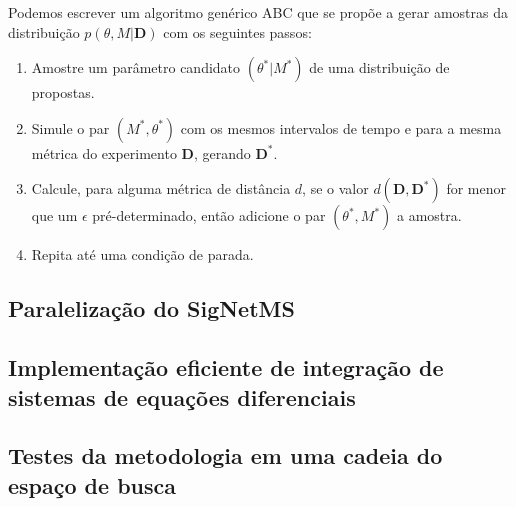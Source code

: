 \documentclass[12pt]{article}
\begin{document}
Podemos escrever um algoritmo genérico ABC que se propõe a gerar 
amostras da distribuição $p(\theta, M | \mathbf{D})$ com os seguintes 
passos:
\begin{enumerate}
    \item Amostre um parâmetro candidato $(\theta^* | M^*)$ de uma
        distribuição de propostas.
    \item Simule o par $(M^*, \theta^*)$ com os mesmos intervalos de
        tempo e para a mesma métrica do experimento $\mathbf{D}$, 
        gerando $\mathbf{D}^*$.
    \item Calcule, para alguma métrica de distância $d$, se o valor $d 
        (\mathbf{D}, \mathbf{D^*})$ for menor que um $\epsilon$
        pré-determinado, então adicione o par $(\theta^*, M^*)$ a 
        amostra.
    \item Repita até uma condição de parada.
\end{enumerate}

\subsection{Paralelização do SigNetMS}

\subsection{Implementação eficiente de integração de sistemas de
equações diferenciais}

\subsection{Testes da metodologia em uma cadeia do espaço de busca}





 

\end{document}
